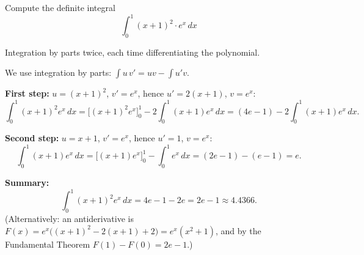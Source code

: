
\begin{question}
Compute the definite integral
\[ \int_0^1 (x+1)^2\cdot e^x\,dx \]
\end{question}

\begin{hint}
Integration by parts twice, each time differentiating the polynomial.
\end{hint}

\begin{solution}
We use integration by parts: $\int u\,v'=uv-\int u'v$.

\textbf{First step:} $u=(x+1)^2$, $v'=e^x$, hence $u'=2(x+1)$, $v=e^x$:
\[ \int_0^1(x+1)^2e^x\,dx=\Big[(x+1)^2e^x\Big]_0^1-2\int_0^1(x+1)e^x\,dx=(4e-1)-2\int_0^1(x+1)e^x\,dx. \]

\textbf{Second step:} $u=x+1$, $v'=e^x$, hence $u'=1$, $v=e^x$:
\[ \int_0^1(x+1)e^x\,dx=\Big[(x+1)e^x\Big]_0^1-\int_0^1e^x\,dx=(2e-1)-(e-1)=e. \]

\textbf{Summary:}
\[ \int_0^1(x+1)^2e^x\,dx=4e-1-2e=\boxed{2e-1}\approx 4.4366. \]
(Alternatively: an antiderivative is $F(x)=e^x\big((x+1)^2-2(x+1)+2\big)=e^x(x^2+1)$, and by the Fundamental Theorem $F(1)-F(0)=2e-1$.)
\end{solution}
